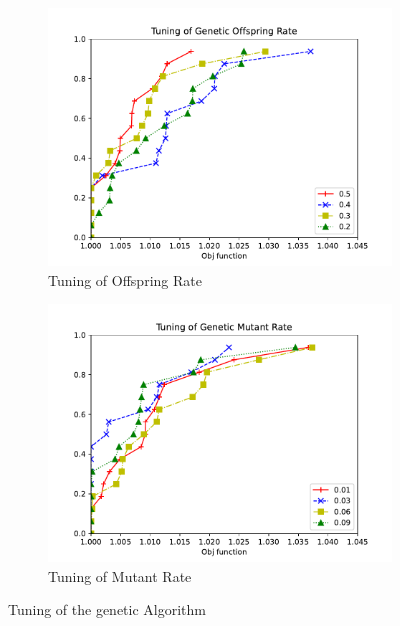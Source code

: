 \begin{figure}[!h]
    \centering
        \begin{subfigure}{0.48\textwidth} %
            \includegraphics[scale=0.45]{images/genoff.pdf} 
            \caption{Tuning of Offspring Rate}
            \label{fig:genoff}
        \end{subfigure}
        \begin{subfigure}{0.48\textwidth}
            \includegraphics[scale=0.45]{images/genmut.pdf}
            \caption{Tuning of Mutant Rate}
            \label{fig:genmut}
        \end{subfigure}
    \caption{Tuning of the genetic Algorithm}
    \end{figure}

